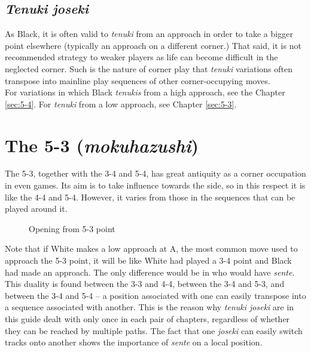\documentclass[a5paper,12pt,twoside]{book} %
\newcounter{joseki}                 %
\newcommand{\addstufftotoc}[2][toc]{%
  \addtocontents{#1}{#2}}
\begin{document}
\addstufftotoc{\nobreak\smallskip\protect\par}
\section{\textit{Tenuki joseki}}

As Black, it is often valid to \textit{tenuki} from an approach in order to take a bigger point elsewhere (typically an approach on a different corner.) That said, it is not recommended strategy to weaker players as life can become difficult in the neglected corner. Such is the nature of corner play that \textit{tenuki} variations often transpose into mainline play sequences of other corner-occupying moves.\\

For variations in which Black \textit{tenukis} from a high approach, see the Chapter \ref{sec:5-4}. For \textit{tenuki} from a low approach, see Chapter \ref{sec:5-3}.\\

\chapter{The 5-3 (\textit{mokuhazushi}) \label{sec:5-3}}

The 5-3, together with the 3-4 and 5-4, has great antiquity as a corner occupation in even games. Its aim is to take influence towards the side, so in this respect it is like the 4-4 and 5-4. However, it varies from those in the sequences that can be played around it. \\

\begin{figure}[!htbp]
 
\vspace{-0.6cm}\caption{Opening from 5-3 point}
\label{5-3:opening-options}
\end{figure}

Note that if White makes a low approach at A, the most common move used to approach the 5-3 point, it will be like White had played a 3-4 point and Black had made an approach. The only difference would be in who would have \textit{sente}. This duality is found between the 3-3 and 4-4, between the 3-4 and 5-3, and between the 3-4 and 5-4 – a position associated with one can easily transpose into a sequence associated with another. This is the reason why \textit{tenuki joseki} are in this guide dealt with only once in each pair of chapters, regardless of whether they can be reached by multiple paths. The fact that one \textit{joseki} can easily switch tracks onto another shows the importance of \textit{sente} on a local position.\\
\end{document}
